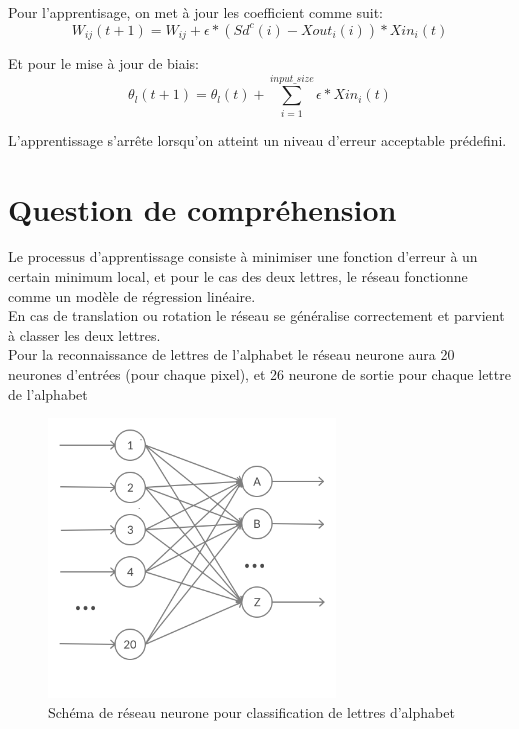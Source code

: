 \documentclass {article}
\begin{document}
Pour l'apprentisage, on met à jour les coefficient comme suit:
\begin{equation}
   W_{ij}(t+1) = W_{ij} + \epsilon * (Sd^c(i) - Xout_{i}(i)) * Xin_{i}(t)
\end{equation}

Et pour le mise à jour de biais:
\begin{equation}
   \theta_{l}(t+1) = \theta_{l}(t) + \sum_{i=1}^{input\_size}\epsilon * Xin_{i}(t)
\end{equation}

L'apprentissage s'arrête lorsqu'on atteint un niveau d'erreur acceptable
prédefini.

\section{Question de compréhension}
Le processus d'apprentissage consiste à minimiser une fonction d'erreur à un
certain minimum local, et pour le cas des deux lettres, le réseau fonctionne
comme un modèle de régression linéaire.\\

En cas de translation ou rotation le réseau se généralise correctement et
parvient à classer les deux lettres.\\

Pour la reconnaissance de lettres de l'alphabet le réseau neurone aura 20
neurones d'entrées (pour chaque pixel), et 26 neurone de sortie pour chaque
lettre de l'alphabet
\begin{figure}[H]
   \centering
   \includegraphics[height=20em]{AZrn.png}
   \caption{Schéma de réseau neurone pour classification de lettres d'alphabet}
\end{figure}
\end{document}
